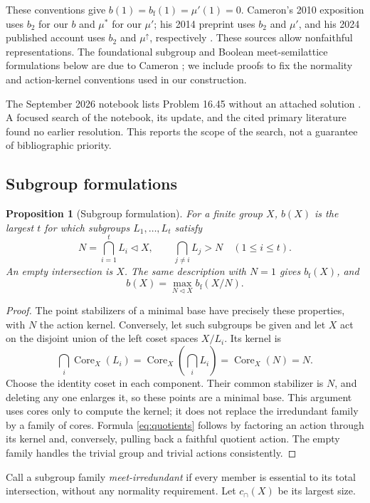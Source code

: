 \documentclass[11pt]{article}
\newtheorem{proposition}[theorem]{Proposition}
\theoremstyle{remark}\newtheorem{remark}[theorem]{Remark}
\newcommand{\mup}{\mu'}
\newcommand{\bfth}{b_{\mathrm f}}
\newcommand{\Core}{\operatorname{Core}}
\newcommand{\rankcap}{c_{\cap}}
\begin{document}
These conventions give $b(1)=\bfth(1)=\mup(1)=0$. Cameron's 2010 exposition
uses $b_2$ for our $b$ and $\mu^*$ for our $\mup$; his 2014 preprint uses $b_2$ and $\mu'$, and his
2024 published account uses $b_2$ and $\mu^\uparrow$, respectively
\cite{blog,paper,cameron2024}. These sources allow nonfaithful representations.
The foundational subgroup and Boolean meet-semilattice formulations below
are due to Cameron \cite{paper,cameron2024}; we include proofs to fix the
normality and action-kernel conventions used in our construction.

The September 2026 notebook lists Problem 16.45 without an attached solution
\cite{notebook}. A focused search of the notebook, its update, and the cited
primary literature found no earlier resolution. This reports the scope of
the search, not a guarantee of bibliographic priority.

\subsection{Subgroup formulations}
\begin{proposition}[Subgroup formulation]
For a finite group $X$, $b(X)$ is the largest $t$ for which subgroups
$L_1,\ldots,L_t$ satisfy
\[
 N=\bigcap_{i=1}^t L_i\lhd X,
 \qquad
 \bigcap_{j\ne i}L_j>N\quad(1\le i\le t).
\]
An empty intersection is $X$. The same description with $N=1$ gives
$\bfth(X)$, and
\begin{equation}\label{eq:quotients}
 b(X)=\max_{N\lhd X}\bfth(X/N).
\end{equation}
\end{proposition}
\begin{proof}
The point stabilizers of a minimal base have precisely these properties, with
$N$ the action kernel. Conversely, let such subgroups be given and let $X$ act
on the disjoint union of the left coset spaces $X/L_i$. Its kernel is
\[
 \bigcap_i\Core_X(L_i)
 =\Core_X\!\left(\bigcap_iL_i\right)=\Core_X(N)=N.
\]
Choose the identity coset in each component. Their common stabilizer is $N$,
and deleting any one enlarges it, so these points are a minimal base. This
argument uses cores only to compute the kernel; it does not replace the
irredundant family by a family of cores. Formula \eqref{eq:quotients} follows
by factoring an action through its kernel and, conversely, pulling back a
faithful quotient action. The empty family handles the trivial group and
trivial actions consistently.
\end{proof}

Call a subgroup family \emph{meet-irredundant} if every member is essential to
its total intersection, without any normality requirement. Let $\rankcap(X)$
be its largest size.
\end{document}
